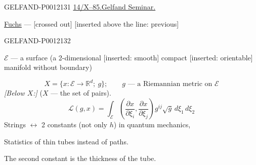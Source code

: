 \begin{GelfandAdjacentEvidence}{GELFAND-P001213}{1}
\underline{14/X--85.}\qquad \underline{Gelfand Seminar.}

\underline{\underline{Fuchs}} ---  [crossed out]
[inserted above the line: previous] 
\end{GelfandAdjacentEvidence}
\begin{GelfandAdjacentEvidence}{GELFAND-P001213}{2}


\(\mathcal E\) --- a surface
(a 2-dimensional [inserted: smooth] compact [inserted: orientable] manifold without boundary)
\end{GelfandAdjacentEvidence}


\[
X=\{x:\mathcal E\to\mathbb R^d;\ g\};
\qquad g\text{ --- a Riemannian metric on }\mathcal E
\]
\textit{[Below \(X\):]} (\(X\) --- the set of pairs).
\begin{equation*}
\mathcal L(g,x)=\int_{\mathcal E}
\left(\frac{\partial x}{\partial\xi_i},\frac{\partial x}{\partial\xi_j}\right)
g^{ij}\sqrt g\,d\xi_1\,d\xi_2\tag{1}
\end{equation*}
 Strings \(\leftrightarrow\) 2 constants (\(\text{not only }h\)) in quantum mechanics,

Statistics of thin tubes instead of paths.

The second constant is the thickness of the tube.


